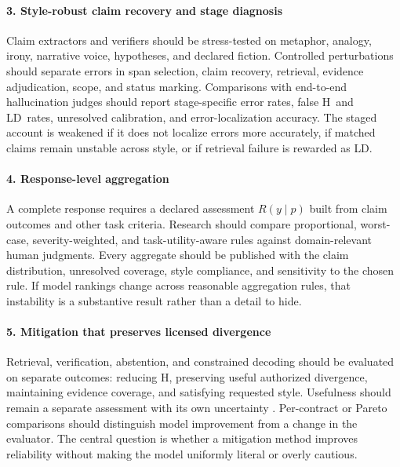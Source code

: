 \documentclass{clv2025}
\newcommand{\LD}{\textsc{LD}}
\newcommand{\Hall}{\textsc{H}}
\begin{document}
\paragraph{3. Style-robust claim recovery and stage diagnosis}
Claim extractors and verifiers should be stress-tested on metaphor,
analogy, irony, narrative voice, hypotheses, and declared fiction.
Controlled perturbations should separate errors in span selection, claim
recovery, retrieval, evidence adjudication, scope, and status marking.
Comparisons with end-to-end hallucination judges should report
stage-specific error rates, false \Hall\ and \LD\ rates, unresolved
calibration, and error-localization accuracy.
The staged account is weakened if it does not localize errors more
accurately, if matched claims remain unstable across style, or if
retrieval failure is rewarded as \LD.

\paragraph{4. Response-level aggregation}
A complete response requires a declared assessment $R(y\mid p)$ built from
claim outcomes and other task criteria.
Research should compare proportional, worst-case, severity-weighted, and
task-utility-aware rules against domain-relevant human judgments.
Every aggregate should be published with the claim distribution,
unresolved coverage, style compliance, and sensitivity to the chosen
rule.
If model rankings change across reasonable aggregation rules, that
instability is a substantive result rather than a detail to hide.

\paragraph{5. Mitigation that preserves licensed divergence}
Retrieval, verification, abstention, and constrained decoding should be
evaluated on separate outcomes: reducing \Hall, preserving useful
authorized divergence, maintaining evidence coverage, and satisfying
requested style.
Usefulness should remain a separate assessment with its own uncertainty
\citep{acar_creativity_2019,marco_reader_2025}.
Per-contract or Pareto comparisons should distinguish model improvement
from a change in the evaluator.
The central question is whether a mitigation method improves reliability
without making the model uniformly literal or overly cautious.
\end{document}
